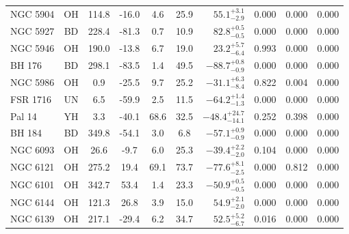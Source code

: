 \begin{tabular}{lcccccrccc}
	NGC 5904 & OH & 114.8 & -16.0 & 4.6 & 25.9 & $55.1^{+3.1}_{-2.9}$ & 0.000 & 0.000 & 0.000 \\
	NGC 5927 & BD & 228.4 & -81.3 & 0.7 & 10.9 & $82.8^{+0.5}_{-0.5}$ & 0.000 & 0.000 & 0.000 \\
	NGC 5946 & OH & 190.0 & -13.8 & 6.7 & 19.0 & $23.2^{+5.7}_{-6.4}$ & 0.993 & 0.000 & 0.000 \\
	BH 176 & BD & 298.1 & -83.5 & 1.4 & 49.5 & $-88.7^{+0.8}_{-0.9}$ & 0.000 & 0.000 & 0.000 \\
	NGC 5986 & OH & 0.9 & -25.5 & 9.7 & 25.2 & $-31.1^{+6.3}_{-8.4}$ & 0.822 & 0.004 & 0.000 \\
	FSR 1716 & UN & 6.5 & -59.9 & 2.5 & 11.5 & $-64.2^{+1.4}_{-1.3}$ & 0.000 & 0.000 & 0.000 \\
	Pal 14 & YH & 3.3 & -40.1 & 68.6 & 32.5 & $-48.4^{+24.7}_{-14.1}$ & 0.252 & 0.398 & 0.000 \\
	BH 184 & BD & 349.8 & -54.1 & 3.0 & 6.8 & $-57.1^{+0.9}_{-0.9}$ & 0.000 & 0.000 & 0.000 \\
	NGC 6093 & OH & 26.6 & -9.7 & 6.0 & 25.3 & $-39.4^{+2.2}_{-2.0}$ & 0.104 & 0.000 & 0.000 \\
	NGC 6121 & OH & 275.2 & 19.4 & 69.1 & 73.7 & $-77.6^{+8.1}_{-2.5}$ & 0.000 & 0.812 & 0.000 \\
	NGC 6101 & OH & 342.7 & 53.4 & 1.4 & 23.3 & $-50.9^{+0.5}_{-0.5}$ & 0.000 & 0.000 & 0.000 \\
	NGC 6144 & OH & 121.3 & 26.8 & 3.9 & 15.0 & $54.9^{+2.1}_{-2.0}$ & 0.000 & 0.000 & 0.000 \\
	NGC 6139 & OH & 217.1 & -29.4 & 6.2 & 34.7 & $52.5^{+5.2}_{-6.7}$ & 0.016 & 0.000 & 0.000 \\
	\bottomrule
\end{tabular}
\endgroup